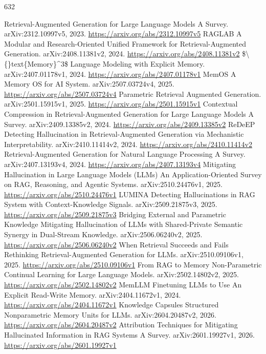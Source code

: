 \documentclass[11pt]{article}
\begin{document}
\begin{thebibliography}{632}
 Retrieval-Augmented Generation for Large Language Models A Survey. arXiv:2312.10997v5, 2023. \url{https://arxiv.org/abs/2312.10997v5}
 RAGLAB A Modular and Research-Oriented Unified Framework for Retrieval-Augmented Generation. arXiv:2408.11381v2, 2024. \url{https://arxiv.org/abs/2408.11381v2}
 \$\textbackslash\{\}text\{Memory\}\textasciicircum{}3\$ Language Modeling with Explicit Memory. arXiv:2407.01178v1, 2024. \url{https://arxiv.org/abs/2407.01178v1}
 MemOS A Memory OS for AI System. arXiv:2507.03724v4, 2025. \url{https://arxiv.org/abs/2507.03724v4}
 Parametric Retrieval Augmented Generation. arXiv:2501.15915v1, 2025. \url{https://arxiv.org/abs/2501.15915v1}
 Contextual Compression in Retrieval-Augmented Generation for Large Language Models A Survey. arXiv:2409.13385v2, 2024. \url{https://arxiv.org/abs/2409.13385v2}
 ReDeEP Detecting Hallucination in Retrieval-Augmented Generation via Mechanistic Interpretability. arXiv:2410.11414v2, 2024. \url{https://arxiv.org/abs/2410.11414v2}
 Retrieval-Augmented Generation for Natural Language Processing A Survey. arXiv:2407.13193v4, 2024. \url{https://arxiv.org/abs/2407.13193v4}
 Mitigating Hallucination in Large Language Models (LLMs) An Application-Oriented Survey on RAG, Reasoning, and Agentic Systems. arXiv:2510.24476v1, 2025. \url{https://arxiv.org/abs/2510.24476v1}
 LUMINA Detecting Hallucinations in RAG System with Context-Knowledge Signals. arXiv:2509.21875v3, 2025. \url{https://arxiv.org/abs/2509.21875v3}
 Bridging External and Parametric Knowledge Mitigating Hallucination of LLMs with Shared-Private Semantic Synergy in Dual-Stream Knowledge. arXiv:2506.06240v2, 2025. \url{https://arxiv.org/abs/2506.06240v2}
 When Retrieval Succeeds and Fails Rethinking Retrieval-Augmented Generation for LLMs. arXiv:2510.09106v1, 2025. \url{https://arxiv.org/abs/2510.09106v1}
 From RAG to Memory Non-Parametric Continual Learning for Large Language Models. arXiv:2502.14802v2, 2025. \url{https://arxiv.org/abs/2502.14802v2}
 MemLLM Finetuning LLMs to Use An Explicit Read-Write Memory. arXiv:2404.11672v1, 2024. \url{https://arxiv.org/abs/2404.11672v1}
 Knowledge Capsules Structured Nonparametric Memory Units for LLMs. arXiv:2604.20487v2, 2026. \url{https://arxiv.org/abs/2604.20487v2}
 Attribution Techniques for Mitigating Hallucinated Information in RAG Systems A Survey. arXiv:2601.19927v1, 2026. \url{https://arxiv.org/abs/2601.19927v1}

\end{thebibliography}
\end{document}
